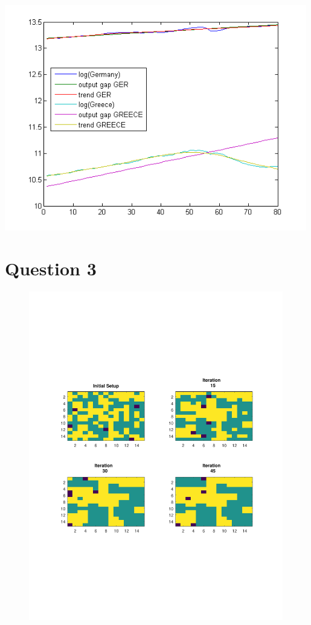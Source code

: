 \documentclass{article}
\begin{document}
\includegraphics[width=0.99\textwidth]{plot3.png}
\newpage
\section{Question 3}

\begin{figure}[h!]
\centering
    \includegraphics[width=0.99\textwidth]{figure_schelling}
\end{figure}

\appendix
\end{document}
